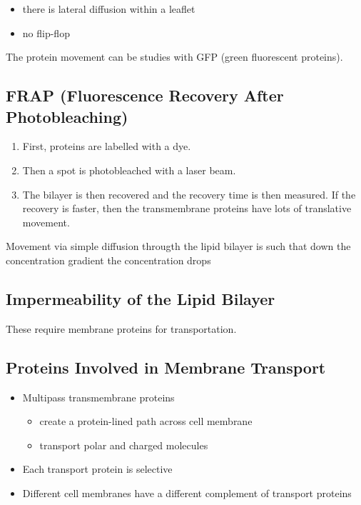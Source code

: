 \documentclass[11pt]{scrartcl}
\begin{document}
\begin{itemize}
\item there is lateral diffusion within a leaflet
\item no flip-flop
\end{itemize}

The protein movement can be studies with GFP (green fluorescent proteins).

\subsection{FRAP (Fluorescence Recovery After Photobleaching)}

\begin{enumerate}
\item\label{item:1} First, proteins are labelled with a dye.
\item Then a spot is photobleached with a laser beam.
\item The bilayer is then recovered and the recovery time is then
  measured. If the recovery is faster, then the transmembrane proteins
  have lots of translative movement.
\end{enumerate}

Movement via simple diffusion througth the lipid bilayer is such that down the concentration gradient the concentration drops

\subsection{Impermeability of the Lipid Bilayer}

These require membrane proteins for transportation.

\subsection{Proteins Involved in Membrane Transport}

\begin{itemize}
\item Multipass transmembrane proteins
\begin{itemize}
\item create a protein-lined path across cell membrane
\item transport polar and charged molecules
\end{itemize}
\item Each transport protein is selective
\item Different cell membranes have a different complement of transport proteins
\end{itemize}
\end{document}
